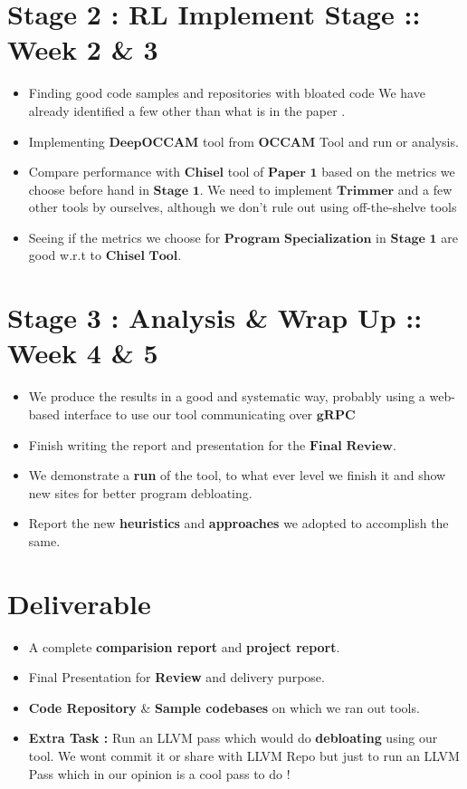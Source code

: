 \documentclass{article} %
\begin{document}
\section*{Stage 2 : RL Implement Stage :: Week 2 \& 3} 
\begin{itemize}
    \item Finding good code samples and repositories with bloated code \color{blue} We have already identified a few other than what is in the paper \color{black}.
    \item Implementing $\textbf{DeepOCCAM}$ tool from $\textbf{OCCAM}$ Tool and run or analysis. 
    \item Compare performance with $\textbf{Chisel}$ tool of $\textbf{Paper 1}$ based on the metrics we choose before hand in $\textbf{Stage 1}$. \color{blue} We need to implement $\textbf{Trimmer}$ and a few other tools by ourselves, although we don't rule out using off-the-shelve tools \color{black}
    \item Seeing if the metrics we choose for $\textbf{Program Specialization}$ in $\textbf{Stage 1}$ are good w.r.t to $\textbf{Chisel Tool}$.  
\end{itemize}

\section*{Stage 3 : Analysis \& Wrap Up :: Week 4 \& 5}
\begin{itemize}
    \item We produce the results in a good and systematic way, probably using a web-based interface to use our tool communicating over $\textbf{gRPC}$
    \item Finish writing the report and presentation for the $\textbf{Final Review}$. 
    \item We demonstrate a \textbf{run} of the tool, to what ever level we finish it and show new sites for better program debloating. 
    \item Report the new \textbf{heuristics} and \textbf{approaches} we adopted to accomplish the same. 
\end{itemize}

\section*{Deliverable} 
    \begin{itemize}
        \item A complete \textbf{comparision report} and \textbf{project report}.
        \item Final Presentation for \textbf{Review} and delivery purpose.
        \item \textbf{Code Repository} \& \textbf{Sample codebases} on which we ran out tools. 
        \item \textbf{Extra Task :} Run an LLVM pass which would do \textbf{debloating} using our tool. \color{blue} We wont commit it or share with LLVM Repo but just to run an LLVM Pass which in our opinion is a cool pass to do ! \color{black}  
    \end{itemize}
\end{document}
